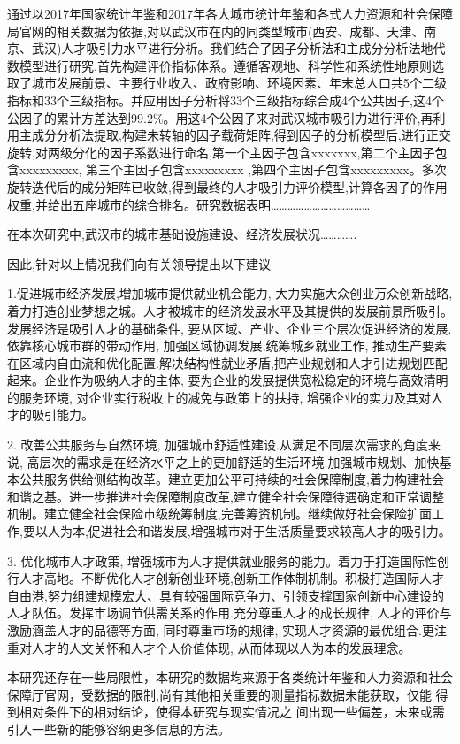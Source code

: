 \documentclass{whutmod}
\begin{document}
通过以2017年国家统计年鉴和2017年各大城市统计年鉴和各式人力资源和社会保障局官网的相关数据为依据,对以武汉市在内的同类型城市(西安、成都、天津、南京、武汉)人才吸引力水平进行分析。我们结合了因子分析法和主成分分析法地代数模型进行研究,首先构建评价指标体系。遵循客观地、科学性和系统性地原则选取了城市发展前景、主要行业收入、政府影响、环境因素、年末总人口共5个二级指标和33个三级指标。并应用因子分析将33个三级指标综合成4个公共因子,这4个公因子的累计方差达到$99.2\%$。用这4个公因子来对武汉城市吸引力进行评价,再利用主成分分析法提取,构建未转轴的因子载荷矩阵,得到因子的分析模型后,进行正交旋转,对两级分化的因子系数进行命名,第一个主因子包含xxxxxxx,第二个主因子包含xxxxxxxxx, 第三个主因子包含xxxxxxxxx ,第四个主因子包含xxxxxxxxx。多次旋转迭代后的成分矩阵已收敛,得到最终的人才吸引力评价模型,计算各因子的作用权重,并给出五座城市的综合排名。研究数据表明………………………………


在本次研究中,武汉市的城市基础设施建设、经济发展状况………….


因此,针对以上情况我们向有关领导提出以下建议

1.促进城市经济发展,增加城市提供就业机会能力, 大力实施大众创业万众创新战略,着力打造创业梦想之城。人才被城市的经济发展水平及其提供的发展前景所吸引。发展经济是吸引人才的基础条件, 要从区域、产业、企业三个层次促进经济的发展.依靠核心城市群的带动作用, 加强区域协调发展,统筹城乡就业工作, 推动生产要素在区域内自由流和优化配置.解决结构性就业矛盾,把产业规划和人才引进规划匹配起来。企业作为吸纳人才的主体, 要为企业的发展提供宽松稳定的环境与高效清明的服务环境, 对企业实行税收上的减免与政策上的扶持, 增强企业的实力及其对人才的吸引能力。

2. 改善公共服务与自然环境, 加强城市舒适性建设.从满足不同层次需求的角度来说, 高层次的需求是在经济水平之上的更加舒适的生活环境.加强城市规划、加快基本公共服务供给侧结构改革。建立更加公平可持续的社会保障制度,着力构建社会和谐之基。进一步推进社会保障制度改革,建立健全社会保障待遇确定和正常调整机制。建立健全社会保险市级统筹制度,完善筹资机制。继续做好社会保险扩面工作,要以人为本,促进社会和谐发展,增强城市对于生活质量要求较高人才的吸引力。

3. 优化城市人才政策, 增强城市为人才提供就业服务的能力。着力于打造国际性创行人才高地。不断优化人才创新创业环境,创新工作体制机制。积极打造国际人才自由港,努力组建规模宏大、具有较强国际竞争力、引领支撑国家创新中心建设的人才队伍。发挥市场调节供需关系的作用.充分尊重人才的成长规律, 人才的评价与激励涵盖人才的品德等方面, 同时尊重市场的规律, 实现人才资源的最优组合.更注重对人才的人文关怀和人才个人价值体现, 从而体现以人为本的发展理念。

本研究还存在一些局限性，本研究的数据均来源于各类统计年鉴和人力资源和社会保障厅官网，受数据的限制,尚有其他相关重要的测量指标数据未能获取，仅能 得到相对条件下的相对结论，使得本研究与现实情况之 间出现一些偏差，未来或需引入一些新的能够容纳更多信息的方法。
\end{document}
